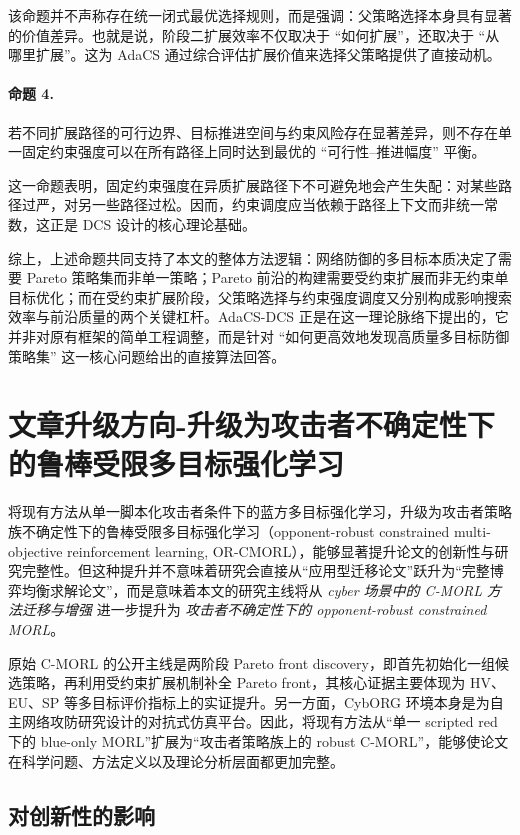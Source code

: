 \documentclass[12pt,a4paper]{article}
\begin{document}
该命题并不声称存在统一闭式最优选择规则，而是强调：父策略选择本身具有显著的价值差异。也就是说，阶段二扩展效率不仅取决于 ``如何扩展''，还取决于 ``从哪里扩展''。这为 AdaCS 通过综合评估扩展价值来选择父策略提供了直接动机。

\paragraph{命题 4.}
若不同扩展路径的可行边界、目标推进空间与约束风险存在显著差异，则不存在单一固定约束强度可以在所有路径上同时达到最优的 ``可行性--推进幅度'' 平衡。

这一命题表明，固定约束强度在异质扩展路径下不可避免地会产生失配：对某些路径过严，对另一些路径过松。因而，约束调度应当依赖于路径上下文而非统一常数，这正是 DCS 设计的核心理论基础。

综上，上述命题共同支持了本文的整体方法逻辑：网络防御的多目标本质决定了需要 Pareto 策略集而非单一策略；Pareto 前沿的构建需要受约束扩展而非无约束单目标优化；而在受约束扩展阶段，父策略选择与约束强度调度又分别构成影响搜索效率与前沿质量的两个关键杠杆。AdaCS-DCS 正是在这一理论脉络下提出的，它并非对原有框架的简单工程调整，而是针对 ``如何更高效地发现高质量多目标防御策略集'' 这一核心问题给出的直接算法回答。



\section{文章升级方向-升级为攻击者不确定性下的鲁棒受限多目标强化学习}


将现有方法从单一脚本化攻击者条件下的蓝方多目标强化学习，升级为攻击者策略族不确定性下的鲁棒受限多目标强化学习（opponent-robust constrained multi-objective reinforcement learning, OR-CMORL），能够显著提升论文的创新性与研究完整性。但这种提升并不意味着研究会直接从“应用型迁移论文”跃升为“完整博弈均衡求解论文”，而是意味着本文的研究主线将从
\emph{cyber 场景中的 C-MORL 方法迁移与增强}
进一步提升为
\emph{攻击者不确定性下的 opponent-robust constrained MORL}。

原始 C-MORL 的公开主线是两阶段 Pareto front discovery，即首先初始化一组候选策略，再利用受约束扩展机制补全 Pareto front，其核心证据主要体现为 HV、EU、SP 等多目标评价指标上的实证提升\cite{CMORL_ICLR2025}。另一方面，CybORG 环境本身是为自主网络攻防研究设计的对抗式仿真平台\cite{CybORG2020}。因此，将现有方法从“单一 scripted red 下的 blue-only MORL”扩展为“攻击者策略族上的 robust C-MORL”，能够使论文在科学问题、方法定义以及理论分析层面都更加完整。

\subsection{对创新性的影响}
\end{document}
